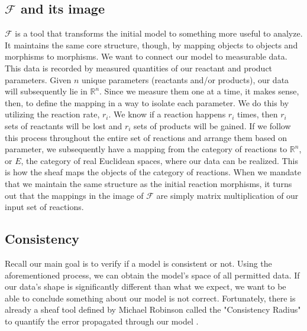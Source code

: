 \documentclass[10.5pt]{article}
\begin{document}
\subsection{$\mathscr{F}$ and its image}
$\mathscr{F}$ is a tool that transforms the initial model to something more useful to analyze. It maintains the same core structure, though, by mapping objects to objects and morphisms to morphisms. 
We want to connect our model to measurable data. This data is recorded by 
measured quantities of our reactant and product parameters. Given $n$ unique 
parameters (reactants and/or products), our data will subsequently lie in 
$\mathbb{R}^n$. Since we measure them one at a time, it makes sense, then, to 
define the mapping in a way to isolate each parameter. We do this by utilizing 
the reaction rate, $r_i$. We know if a reaction happens $r_i$ times, then $r_i$ 
sets of reactants will be lost and $r_i$ sets of products will be gained. If we 
follow this process throughout the entire set of reactions and arrange them 
based on parameter, we subsequently have a mapping from the category of 
reactions to $\mathbb{R}^n$, or $E$, the category of real Euclidean spaces, 
where our data can be realized. This is how the sheaf maps the objects of the 
category of reactions. When we mandate that we maintain the same structure as 
the initial reaction morphisms, it turns out that the mappings in the image of 
$\mathscr{F}$ are simply matrix multiplication of our input set of reactions.
\subsection{Consistency}
Recall our main goal is to verify if a model is consistent or not. Using the 
aforementioned process, we can obtain the model's space of all permitted data. 
If our data's shape is significantly different than what we expect, we want to 
be able to conclude something about our model is not correct. Fortunately, 
there is already a sheaf tool defined by Michael Robinson called the 
"Consistency Radius" to quantify the error propagated through our model 
\cite{robinson2017sheaves}.
\end{document}
